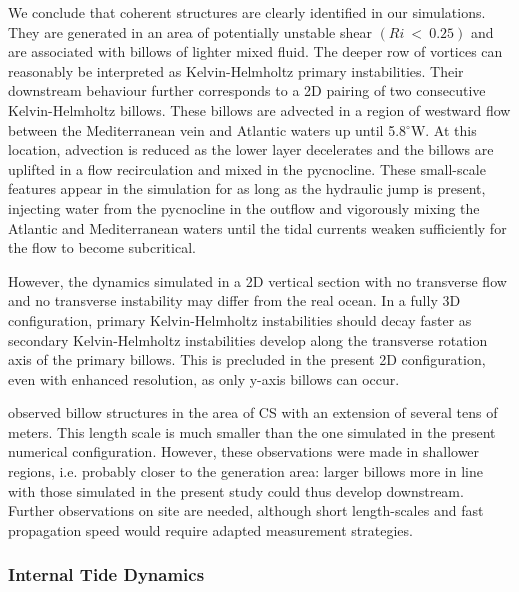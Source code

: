 We conclude that coherent structures are clearly identified in our simulations. They are generated in an area of potentially unstable shear $(Ri\ <\ 0.25)$ and are associated with billows of lighter mixed fluid. The deeper row of vortices can reasonably be interpreted as Kelvin-Helmholtz primary instabilities. Their downstream behaviour further corresponds to a 2D pairing of two consecutive Kelvin-Helmholtz billows. These billows are advected in a region of westward flow between the Mediterranean vein and  Atlantic waters up until 5.8$^\circ$W. At this location, advection is reduced as the lower layer decelerates and the billows are uplifted in a flow recirculation and mixed in the pycnocline.
These small-scale features appear in the simulation for as long as the hydraulic jump is present, injecting water from the pycnocline in the outflow and vigorously mixing the Atlantic and Mediterranean waters until the tidal currents weaken sufficiently for the flow to become subcritical. 

 However, the dynamics simulated in a 2D vertical section with no transverse flow and no transverse instability may differ from the real ocean. In a fully 3D configuration, primary Kelvin-Helmholtz instabilities should decay faster as secondary Kelvin-Helmholtz instabilities develop along the transverse rotation axis of the primary billows. This is precluded in the present 2D configuration, even with enhanced resolution, as only y-axis billows can occur.

\citet{wesson_1994} observed billow structures in the area of CS with an extension of several tens of meters. This length scale is much smaller than the one simulated in the present numerical configuration. However, these observations were made in shallower regions, i.e. probably closer to the generation area: larger billows more in line with those simulated in the present study could thus develop downstream. Further observations on site are needed, although short length-scales and fast propagation speed would require adapted measurement strategies.

\subsubsection{Internal Tide Dynamics}
\label{sisw}

